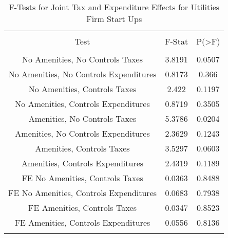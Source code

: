 
\begin{table}[!htbp] \centering 
  \caption{F-Tests for Joint Tax and Expenditure Effects for Utilities Firm Start Ups} 
  \label{22Ftests} 
\begin{tabular}{@{\extracolsep{5pt}} ccc} 
\\[-1.8ex]\hline 
\hline \\[-1.8ex] 
Test & F-Stat & P(\textgreater F) \\ 
\hline \\[-1.8ex] 
No Amenities, No Controls Taxes & 3.8191 & 0.0507 \\ 
No Amenities, No Controls Expenditures & 0.8173 & 0.366 \\ 
No Amenities, Controls Taxes & 2.422 & 0.1197 \\ 
No Amenities, Controls Expenditures & 0.8719 & 0.3505 \\ 
Amenities, No Controls Taxes & 5.3786 & 0.0204 \\ 
Amenities, No Controls Expenditures & 2.3629 & 0.1243 \\ 
Amenities, Controls Taxes & 3.5297 & 0.0603 \\ 
Amenities, Controls Expenditures & 2.4319 & 0.1189 \\ 
FE No Amenities, Controls Taxes & 0.0363 & 0.8488 \\ 
FE No Amenities, Controls Expenditures & 0.0683 & 0.7938 \\ 
FE Amenities, Controls Taxes & 0.0347 & 0.8523 \\ 
FE Amenities, Controls Expenditures & 0.0556 & 0.8136 \\ 
\hline \\[-1.8ex] 
\end{tabular} 
\end{table} 
